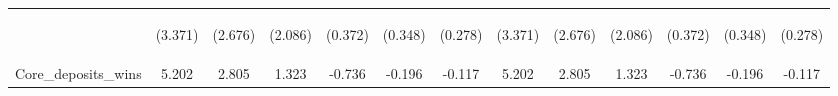 \documentclass[]{article}
\begin{document}
\begin{center}
\begin{tabular}{lcccccccccccc}
\vspace{4pt} & \begin{footnotesize}(3.371)\end{footnotesize} & \begin{footnotesize}(2.676)\end{footnotesize} & \begin{footnotesize}(2.086)\end{footnotesize} & \begin{footnotesize}(0.372)\end{footnotesize} & \begin{footnotesize}(0.348)\end{footnotesize} & \begin{footnotesize}(0.278)\end{footnotesize} & \begin{footnotesize}(3.371)\end{footnotesize} & \begin{footnotesize}(2.676)\end{footnotesize} & \begin{footnotesize}(2.086)\end{footnotesize} & \begin{footnotesize}(0.372)\end{footnotesize} & \begin{footnotesize}(0.348)\end{footnotesize} & \begin{footnotesize}(0.278)\end{footnotesize} \\
Core\_deposits\_wins & 5.202 & 2.805 & 1.323 & -0.736 & -0.196 & -0.117 & 5.202 & 2.805 & 1.323 & -0.736 & -0.196 & -0.117 \\

\end{tabular}
\end{center}
\end{document}
